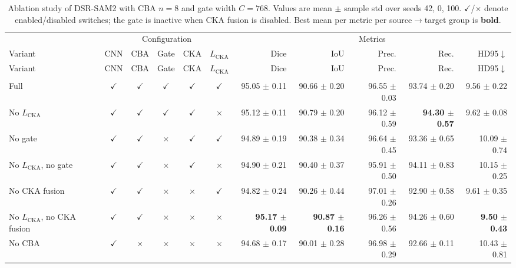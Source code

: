 \documentclass[10pt]{article}
\begin{document}
{\scriptsize
\setlength{\tabcolsep}{2pt}
\begin{longtable}{lccccc rrrrr}
\caption{Ablation study of DSR-SAM2 with CBA $n=8$ and gate width $C=768$. Values are mean $\pm$ sample std over seeds 42, 0, 100. $\checkmark$/$\times$ denote enabled/disabled switches; the gate is inactive when CKA fusion is disabled. Best mean per metric per source$\rightarrow$target group is \textbf{bold}.}
\label{tab:ablation_dsr_sam2}\\
\toprule
& \multicolumn{5}{c}{Configuration} & \multicolumn{5}{c}{Metrics} \\
\cmidrule(lr){2-6}\cmidrule(lr){7-11}
Variant & CNN & CBA & Gate & CKA & $L_{\mathrm{CKA}}$ & Dice & IoU & Prec. & Rec. & HD95$\downarrow$ \\
\midrule
\endfirsthead
\toprule
Variant & CNN & CBA & Gate & CKA & $L_{\mathrm{CKA}}$ & Dice & IoU & Prec. & Rec. & HD95$\downarrow$ \\
\midrule
\endhead
\endfoot
\bottomrule
\endlastfoot
\multicolumn{11}{l}{\textit{Source: OTU $\rightarrow$ Target: OVATUS}} \\
\midrule
Full & $\checkmark$ & $\checkmark$ & $\checkmark$ & $\checkmark$ & $\checkmark$ & 95.05 $\pm$ 0.11 & 90.66 $\pm$ 0.20 & 96.55 $\pm$ 0.03 & 93.74 $\pm$ 0.20 & 9.56 $\pm$ 0.22 \\
No $L_{\mathrm{CKA}}$ & $\checkmark$ & $\checkmark$ & $\checkmark$ & $\checkmark$ & $\times$ & 95.12 $\pm$ 0.11 & 90.79 $\pm$ 0.20 & 96.12 $\pm$ 0.59 & \textbf{94.30 $\pm$ 0.57} & 9.62 $\pm$ 0.08 \\
No gate & $\checkmark$ & $\checkmark$ & $\times$ & $\checkmark$ & $\checkmark$ & 94.89 $\pm$ 0.19 & 90.38 $\pm$ 0.34 & 96.64 $\pm$ 0.45 & 93.36 $\pm$ 0.65 & 10.09 $\pm$ 0.74 \\
No $L_{\mathrm{CKA}}$, no gate & $\checkmark$ & $\checkmark$ & $\times$ & $\checkmark$ & $\times$ & 94.90 $\pm$ 0.21 & 90.40 $\pm$ 0.37 & 95.91 $\pm$ 0.50 & 94.11 $\pm$ 0.83 & 10.15 $\pm$ 0.25 \\
No CKA fusion & $\checkmark$ & $\checkmark$ & $\times$ & $\times$ & $\checkmark$ & 94.82 $\pm$ 0.24 & 90.26 $\pm$ 0.44 & 97.01 $\pm$ 0.26 & 92.90 $\pm$ 0.58 & 9.61 $\pm$ 0.35 \\
No $L_{\mathrm{CKA}}$, no CKA fusion & $\checkmark$ & $\checkmark$ & $\times$ & $\times$ & $\times$ & \textbf{95.17 $\pm$ 0.09} & \textbf{90.87 $\pm$ 0.16} & 96.26 $\pm$ 0.56 & 94.26 $\pm$ 0.60 & \textbf{9.50 $\pm$ 0.43} \\
No CBA & $\checkmark$ & $\times$ & $\times$ & $\times$ & $\times$ & 94.68 $\pm$ 0.17 & 90.01 $\pm$ 0.28 & 96.98 $\pm$ 0.29 & 92.66 $\pm$ 0.11 & 10.43 $\pm$ 0.81 \\

\end{longtable}}
\end{document}

